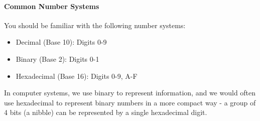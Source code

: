 \documentclass[11pt]{report}
\begin{document}
\paragraph{Common Number Systems} You should be familiar with the following number systems:
\begin{itemize}
    \item Decimal (Base 10): Digits 0-9
    \item Binary (Base 2): Digits 0-1
    \item Hexadecimal (Base 16): Digits 0-9, A-F
\end{itemize}

In computer systems, we use binary to represent information, and we would often use hexadecimal to represent binary numbers in a more compact way - a group of 4 bits (a nibble) can be represented by a single hexadecimal digit.
\end{document}
